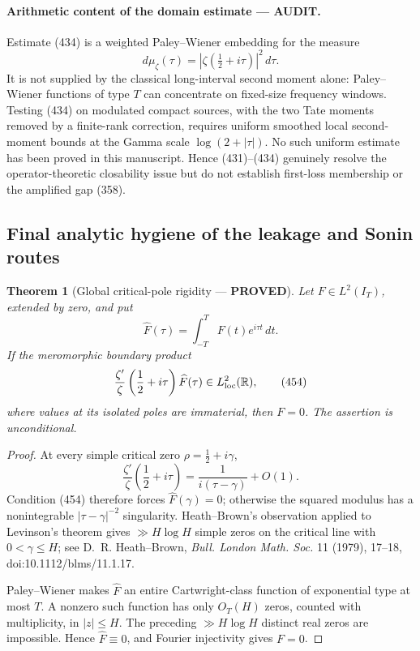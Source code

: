\documentclass[11pt]{article}
\newtheorem{theorem}{Theorem}
\newcommand{\PROVED}{\textcolor{green!45!black}{\textbf{PROVED}}}
\newcommand{\AUDIT}{\textcolor{orange!75!black}{\textbf{AUDIT}}}
\begin{document}
\paragraph{Arithmetic content of the domain estimate --- \AUDIT.}
Estimate (434) is a weighted Paley--Wiener embedding for the measure
\[
 d\mu_\zeta(\tau)=|\zeta(\tfrac12+i\tau)|^2\,d\tau.
\]
It is not supplied by the classical long-interval second moment alone:
Paley--Wiener functions of type $T$ can concentrate on fixed-size frequency
windows.  Testing (434) on modulated compact sources, with the two Tate
moments removed by a finite-rank correction, requires uniform smoothed local
second-moment bounds at the Gamma scale $\log(2+|\tau|)$.  No such uniform
estimate has been proved in this manuscript.  Hence (431)--(434) genuinely
resolve the operator-theoretic closability issue but do not establish
first-loss membership or the amplified gap (358).

\subsection{Final analytic hygiene of the leakage and Sonin routes}

\begin{theorem}[Global critical-pole rigidity --- \PROVED]
Let \(F\in L^2(I_T)\), extended by zero, and put
\[
 \widehat F(\tau)=\int_{-T}^{T}F(t)e^{i\tau t}\,dt.
\]
If the meromorphic boundary product
\begin{equation}
 \frac{\zeta'}{\zeta}\left(\frac12+i\tau\right)
       \widehat F(\tau)
 \in L^2_{\rm loc}(\mathbb R),                       \tag{454}
\end{equation}
where values at its isolated poles are immaterial, then \(F=0\).
The assertion is unconditional.
\end{theorem}

\begin{proof}
At every simple critical zero
\(\rho=\frac12+i\gamma\),
\[
 \frac{\zeta'}{\zeta}\left(\frac12+i\tau\right)
 =\frac{1}{i(\tau-\gamma)}+O(1).
\]
Condition (454) therefore forces \(\widehat F(\gamma)=0\); otherwise the
squared modulus has a nonintegrable
\(|\tau-\gamma|^{-2}\) singularity.  Heath--Brown's observation applied to
Levinson's theorem gives \(\gg H\log H\) simple zeros on the critical line
with \(0<\gamma\le H\); see D.~R. Heath--Brown,
\emph{Bull. London Math. Soc.} 11 (1979), 17--18,
doi:10.1112/blms/11.1.17.

Paley--Wiener makes \(\widehat F\) an entire Cartwright-class function of
exponential type at most \(T\).  A nonzero such function has only \(O_T(H)\)
zeros, counted with multiplicity, in \(|z|\le H\).  The preceding
\(\gg H\log H\) distinct real zeros are impossible.  Hence
\(\widehat F\equiv0\), and Fourier injectivity gives \(F=0\).
\end{proof}
\end{document}
